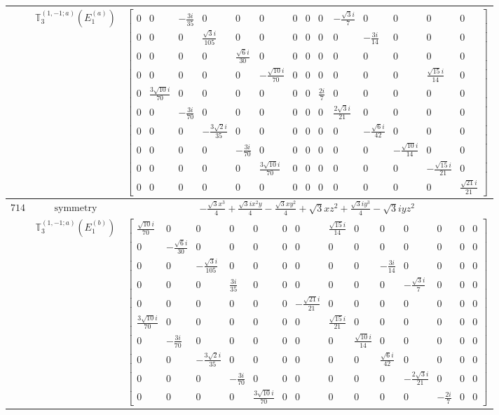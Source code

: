 \documentclass[fleqn,8pt,landscape]{jsarticle}
\begin{document}
\begin{longtable}{ccc}
$  $ & $ \mathbb{T}_{3}^{(1,-1;a)}(E_{1}^{(a)}) $ & $ \begin{bmatrix} 0 & 0 & - \frac{3 i}{35} & 0 & 0 & 0 & 0 & 0 & 0 & - \frac{\sqrt{3} i}{7} & 0 & 0 & 0 & 0 \\ 0 & 0 & 0 & \frac{\sqrt{3} i}{105} & 0 & 0 & 0 & 0 & 0 & 0 & - \frac{3 i}{14} & 0 & 0 & 0 \\ 0 & 0 & 0 & 0 & \frac{\sqrt{6} i}{30} & 0 & 0 & 0 & 0 & 0 & 0 & 0 & 0 & 0 \\ 0 & 0 & 0 & 0 & 0 & - \frac{\sqrt{10} i}{70} & 0 & 0 & 0 & 0 & 0 & 0 & \frac{\sqrt{15} i}{14} & 0 \\ 0 & \frac{3 \sqrt{10} i}{70} & 0 & 0 & 0 & 0 & 0 & 0 & \frac{2 i}{7} & 0 & 0 & 0 & 0 & 0 \\ 0 & 0 & - \frac{3 i}{70} & 0 & 0 & 0 & 0 & 0 & 0 & \frac{2 \sqrt{3} i}{21} & 0 & 0 & 0 & 0 \\ 0 & 0 & 0 & - \frac{3 \sqrt{2} i}{35} & 0 & 0 & 0 & 0 & 0 & 0 & - \frac{\sqrt{6} i}{42} & 0 & 0 & 0 \\ 0 & 0 & 0 & 0 & - \frac{3 i}{70} & 0 & 0 & 0 & 0 & 0 & 0 & - \frac{\sqrt{10} i}{14} & 0 & 0 \\ 0 & 0 & 0 & 0 & 0 & \frac{3 \sqrt{10} i}{70} & 0 & 0 & 0 & 0 & 0 & 0 & - \frac{\sqrt{15} i}{21} & 0 \\ 0 & 0 & 0 & 0 & 0 & 0 & 0 & 0 & 0 & 0 & 0 & 0 & 0 & \frac{\sqrt{21} i}{21} \end{bmatrix} $ \\ \hline
$ 714 $ & $ \text{symmetry} $ & $ - \frac{\sqrt{3} x^{3}}{4} + \frac{\sqrt{3} i x^{2} y}{4} - \frac{\sqrt{3} x y^{2}}{4} + \sqrt{3} x z^{2} + \frac{\sqrt{3} i y^{3}}{4} - \sqrt{3} i y z^{2} $ \\
$  $ & $ \mathbb{T}_{3}^{(1,-1;a)}(E_{1}^{(b)}) $ & $ \begin{bmatrix} \frac{\sqrt{10} i}{70} & 0 & 0 & 0 & 0 & 0 & 0 & \frac{\sqrt{15} i}{14} & 0 & 0 & 0 & 0 & 0 & 0 \\ 0 & - \frac{\sqrt{6} i}{30} & 0 & 0 & 0 & 0 & 0 & 0 & 0 & 0 & 0 & 0 & 0 & 0 \\ 0 & 0 & - \frac{\sqrt{3} i}{105} & 0 & 0 & 0 & 0 & 0 & 0 & - \frac{3 i}{14} & 0 & 0 & 0 & 0 \\ 0 & 0 & 0 & \frac{3 i}{35} & 0 & 0 & 0 & 0 & 0 & 0 & - \frac{\sqrt{3} i}{7} & 0 & 0 & 0 \\ 0 & 0 & 0 & 0 & 0 & 0 & - \frac{\sqrt{21} i}{21} & 0 & 0 & 0 & 0 & 0 & 0 & 0 \\ \frac{3 \sqrt{10} i}{70} & 0 & 0 & 0 & 0 & 0 & 0 & \frac{\sqrt{15} i}{21} & 0 & 0 & 0 & 0 & 0 & 0 \\ 0 & - \frac{3 i}{70} & 0 & 0 & 0 & 0 & 0 & 0 & \frac{\sqrt{10} i}{14} & 0 & 0 & 0 & 0 & 0 \\ 0 & 0 & - \frac{3 \sqrt{2} i}{35} & 0 & 0 & 0 & 0 & 0 & 0 & \frac{\sqrt{6} i}{42} & 0 & 0 & 0 & 0 \\ 0 & 0 & 0 & - \frac{3 i}{70} & 0 & 0 & 0 & 0 & 0 & 0 & - \frac{2 \sqrt{3} i}{21} & 0 & 0 & 0 \\ 0 & 0 & 0 & 0 & \frac{3 \sqrt{10} i}{70} & 0 & 0 & 0 & 0 & 0 & 0 & - \frac{2 i}{7} & 0 & 0 \end{bmatrix} $ \\ \hline

\end{longtable}
\end{document}
